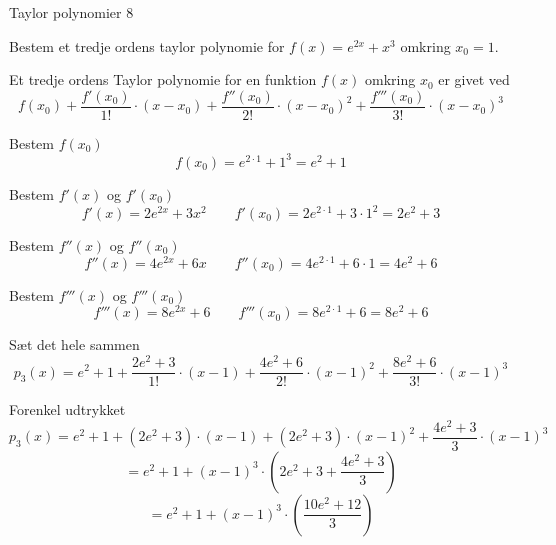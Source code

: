 \documentclass{article}
\begin{document}
\begin{exercise}{Taylor polynomier 8}
	
	Bestem et tredje ordens taylor polynomie for $f(x) = e^{2x} + x^3$
	omkring $x_0 = 1$.
	
	
	\hint
	Et tredje ordens Taylor polynomie for en funktion $f(x)$
	omkring $x_0$ er givet ved
	\[
	f(x_0) + \frac{f'(x_0)}{1!} \cdot (x - x_0) 
	+ \frac{f''(x_0)}{2!} \cdot (x - x_0)^2 
	+ \frac{f'''(x_0)}{3!} \cdot (x - x_0)^3 
	\]
	
	
	\hint
	Bestem $f(x_0)$
	\[
	f(x_0)  = e^{2 \cdot 1} + 1^3 = e^2 + 1
	\]
	
	\hint
	Bestem $f'(x)$ og $f'(x_0)$
	\[
	f'(x) = 2 e^{2x} + 3x^2  \qquad f'(x_0)= 2e^{2 \cdot 1} + 3 \cdot 1^2 = 2e^2 + 3
	\]
	
	\hint
	Bestem $f''(x)$ og $f''(x_0)$
	\[
	f''(x) = 4e^{2x} + 6x \qquad f''(x_0)  = 4e^{2 \cdot 1} + 6 \cdot 1 = 4e^2 + 6
	\]
	
	\hint
	Bestem $f'''(x)$ og $f'''(x_0)$
	\[
	f'''(x) = 8 e^{2x} + 6 \qquad f'''(x_0) =  8e^{2 \cdot 1} + 6 = 8e^2 + 6
	\]
	
	\hint
	Sæt det hele sammen
	\[
	p_3(x) = e^2 + 1 + \frac{2e^2 + 3}{1!} \cdot (x-1) + \frac{4e^2+6}{2!} \cdot (x-1)^2 + \frac{8e^2 + 6}{3!} \cdot (x-1)^3	
	\]
	
	\hint
	Forenkel udtrykket
	\[
	p_3(x) = e^2 + 1 + (2e^2 + 3) \cdot (x-1) + (2e^2+3) \cdot (x-1)^2 + \frac{4e^2 + 3}{3} \cdot (x-1)^3 
	\]
	\[
			   = e^2 + 1 + (x-1)^3 \cdot \left(2e^2 + 3 + \frac{4e^2 + 3}{3} \right) 
	\]
	\[
			   = e^2 + 1 + (x-1)^3 \cdot \left(  \frac{10e^2 + 12}{3} \right) 
	\]
	
\end{exercise}
\end{document}
